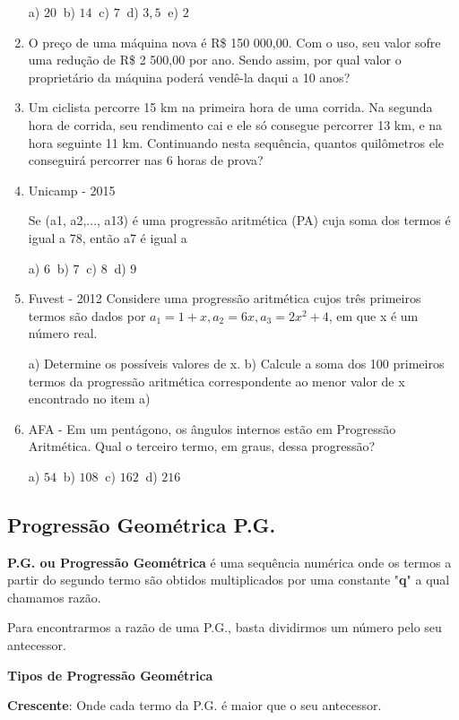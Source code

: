 \begin{multicols*}{2}
\begin{enumerate}
	a) $20 \ $ b) $14 \ $ c) $7 \ $ d) $3,5 \ $ e) $2 $

\item O preço de uma máquina nova é R\$ 150 000,00. Com o uso, seu valor sofre uma redução de R\$ 2 500,00 por ano. Sendo assim, por qual valor o proprietário da máquina poderá vendê-la daqui a 10 anos?

\item Um ciclista percorre 15 km na primeira hora de uma corrida. Na segunda hora de corrida, seu rendimento cai e ele só consegue percorrer 13 km, e na hora seguinte 11 km. Continuando nesta sequência, quantos quilômetros ele conseguirá percorrer nas 6 horas de prova?

\item Unicamp - 2015

Se (a1, a2,..., a13) é uma progressão aritmética (PA) cuja soma dos termos é igual a 78, então a7 é igual a

	a) $6 \ $ b) $7 \ $ c) $8 \ $ d) $9 $
	
\item Fuvest - 2012 Considere uma progressão aritmética cujos três primeiros termos são dados por $ a_1 = 1 + x, a_2 = 6x, a_3 = 2x^2 + 4$, em que x é um número real.

a) Determine os possíveis valores de x.
b) Calcule a soma dos 100 primeiros termos da progressão aritmética correspondente ao menor valor de x encontrado no item a)

\item AFA - Em um pentágono, os ângulos internos estão em Progressão Aritmética. Qual o terceiro termo, em graus, dessa progressão?

	a) $54 \ $ b) $108 \ $ c) $162 \ $ d) $216 $

\end{enumerate}

\subsection{Progressão Geométrica P.G.}

\textbf{P.G. ou Progressão Geométrica} é uma sequência numérica onde os termos a partir do segundo termo são obtidos multiplicados por uma constante "\textbf{q}" a qual chamamos razão.

Para encontrarmos a razão de uma P.G., basta dividirmos um número pelo seu antecessor.

\textbf{Tipos de Progressão Geométrica}

\textbf{Crescente}: Onde cada termo da P.G. é maior que o seu antecessor.


\end{multicols*}
